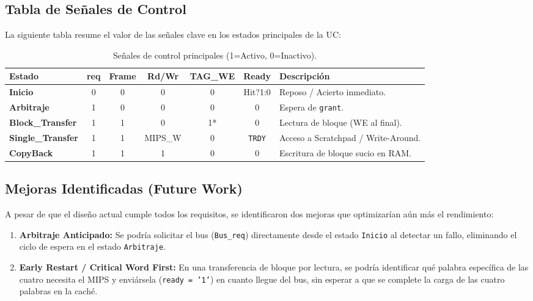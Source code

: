 \documentclass[12pt,a4paper]{article}
\begin{document}
\newpage
\subsection{Tabla de Señales de Control}
La siguiente tabla resume el valor de las señales clave en los estados principales de la UC:

\begin{table}[H]
\centering
\small
\renewcommand{\arraystretch}{1.5}
\begin{tabularx}{\textwidth}{@{} l c c c c c X @{}}
\toprule
\textbf{Estado} & \textbf{req} & \textbf{Frame} & \textbf{Rd/Wr} & \textbf{TAG\_WE} & \textbf{Ready} & \textbf{Descripción} \\
\midrule
\rowcolor{gray!10} \textbf{Inicio} & 0 & 0 & 0 & 0 & Hit?1:0 & Reposo / Acierto inmediato. \\
\textbf{Arbitraje} & 1 & 0 & 0 & 0 & 0 & Espera de \texttt{grant}. \\
\rowcolor{gray!10} \textbf{Block\_Transfer} & 1 & 1 & 0 & 1* & 0 & Lectura de bloque (WE al final). \\
\textbf{Single\_Transfer} & 1 & 1 & MIPS\_W & 0 & \texttt{TRDY} & Acceso a Scratchpad / Write-Around. \\
\rowcolor{gray!10} \textbf{CopyBack} & 1 & 1 & 1 & 0 & 0 & Escritura de bloque sucio en RAM. \\
\bottomrule
\end{tabularx}
\caption{Señales de control principales (1=Activo, 0=Inactivo).}
\end{table}





\subsection{Mejoras Identificadas (Future Work)}
A pesar de que el diseño actual cumple todos los requisitos, se identificaron dos mejoras que optimizarían aún más el rendimiento:
\begin{enumerate}
    \item \textbf{Arbitraje Anticipado:} Se podría solicitar el bus (\texttt{Bus\_req}) directamente desde el estado \texttt{Inicio} al detectar un fallo, eliminando el ciclo de espera en el estado \texttt{Arbitraje}.
    \item \textbf{Early Restart / Critical Word First:} En una transferencia de bloque por lectura, se podría identificar qué palabra específica de las cuatro necesita el MIPS y enviársela (\texttt{ready = '1'}) en cuanto llegue del bus, sin esperar a que se complete la carga de las cuatro palabras en la caché.
\end{enumerate}
\end{document}

